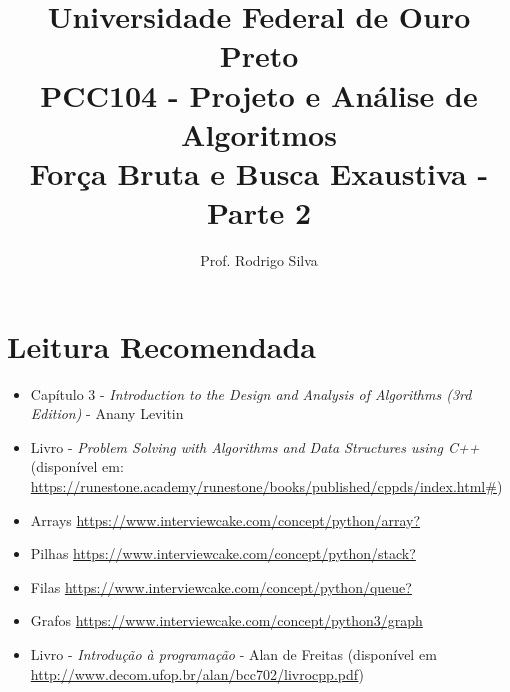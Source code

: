 \documentclass{article}
\title{\vspace{-2 cm}Universidade Federal de Ouro Preto \\ PCC104 - Projeto e Análise de Algoritmos \\ Força Bruta e Busca Exaustiva -Parte 2}
\author{Prof. Rodrigo Silva}
\begin{document}
\maketitle


\section{Leitura Recomendada}

\begin{itemize}
    \item Capítulo 3 - \textit{Introduction to the Design and Analysis of Algorithms (3rd Edition)} - Anany Levitin 
    \item Livro - \textit{Problem Solving with Algorithms and Data Structures using C++} (disponível em: \url{https://runestone.academy/runestone/books/published/cppds/index.html#})
    \item Arrays \url{https://www.interviewcake.com/concept/python/array?}
    \item Pilhas \url{https://www.interviewcake.com/concept/python/stack?}
    \item Filas \url{https://www.interviewcake.com/concept/python/queue?}
    \item Grafos \url{https://www.interviewcake.com/concept/python3/graph}
    \item Livro - \textit{Introdução à programação} - Alan de Freitas (disponível em \url{http://www.decom.ufop.br/alan/bcc702/livrocpp.pdf})
\end{itemize}
\end{document}
